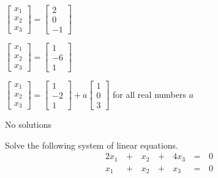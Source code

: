\documentclass{article}
\begin{document}
\begin{readinessAssuranceTest}
  \begin{multicols}{2}
  \begin{readinessAssuranceTestChoices}
  \item \(
          \begin{bmatrix}
            x_1 \\ x_2 \\ x_3
          \end{bmatrix}=
          \begin{bmatrix}
            2 \\ 0 \\ -1
          \end{bmatrix}
        \) %
  \item \(
          \begin{bmatrix}
            x_1 \\ x_2 \\ x_3
          \end{bmatrix}=
          \begin{bmatrix}
            1 \\ -6 \\ 1
          \end{bmatrix}
        \)
  \item \(
          \begin{bmatrix}
            x_1 \\ x_2 \\ x_3
          \end{bmatrix}=
          \begin{bmatrix}
            1 \\ -2 \\ 1
          \end{bmatrix}+
          a
          \begin{bmatrix}
            1 \\ 0 \\ 3
          \end{bmatrix}
        \) for all real numbers \(a\)
  \item No solutions
  \end{readinessAssuranceTestChoices}
  \end{multicols}

  \item Solve the following system of linear equations.
  \begin{alignat*}{4}
    2x_1 &\,+\,& x_2 &\,+\,& 4x_3 &\,=\,& 0 \\
     x_1 &\,+\,& x_2 &\,+\,&  x_3 &\,=\,& 0 \\
  \end{alignat*}


\end{readinessAssuranceTest}
\end{document}
